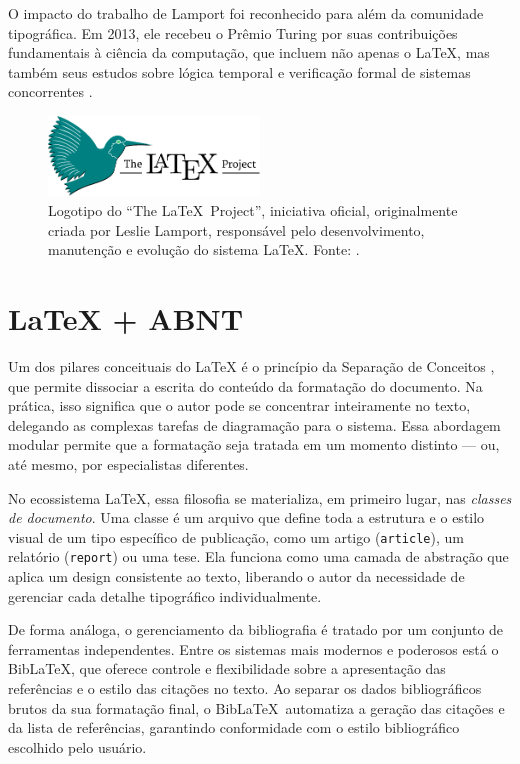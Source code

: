 O impacto do trabalho de Lamport foi reconhecido para além da comunidade tipográfica. Em 2013, ele recebeu o Prêmio Turing por suas contribuições fundamentais à ciência da computação, que incluem não apenas o \LaTeX, mas também seus estudos sobre lógica temporal e verificação formal de sistemas concorrentes \cite{LamportTuring2013}.

\begin{figure}
    \centering
    \includegraphics[width=0.5\textwidth]{img/LaTeX_project_logo.pdf}
    \caption{Logotipo do ``The \LaTeX\ Project'', iniciativa oficial, originalmente criada por Leslie Lamport, responsável pelo desenvolvimento, manutenção e evolução do sistema \LaTeX. Fonte: \textcite{LaTeXProjectLogo}.}
    \label{fig:latex-project-logo}
\end{figure}

\section{\LaTeX{} + ABNT} \label{sec:latex-abnt}

Um dos pilares conceituais do \LaTeX{} é o princípio da Separação de Conceitos \cite{Dijkstra1982}, que permite dissociar a escrita do conteúdo da formatação do documento. Na prática, isso significa que o autor pode se concentrar inteiramente no texto, delegando as complexas tarefas de diagramação para o sistema. Essa abordagem modular permite que a formatação seja tratada em um momento distinto --- ou, até mesmo, por especialistas diferentes.

No ecossistema \LaTeX{}, essa filosofia se materializa, em primeiro lugar, nas \emph{classes de documento}. Uma classe é um arquivo que define toda a estrutura e o estilo visual de um tipo específico de publicação, como um artigo (\texttt{article}), um relatório (\texttt{report}) ou uma tese. Ela funciona como uma camada de abstração que aplica um design consistente ao texto, liberando o autor da necessidade de gerenciar cada detalhe tipográfico individualmente.

De forma análoga, o gerenciamento da bibliografia é tratado por um conjunto de ferramentas independentes. Entre os sistemas mais modernos e poderosos está o Bib\LaTeX, que oferece controle e flexibilidade sobre a apresentação das referências e o estilo das citações no texto. Ao separar os dados bibliográficos brutos da sua formatação final, o Bib\LaTeX\ automatiza a geração das citações e da lista de referências, garantindo conformidade com o estilo bibliográfico escolhido pelo usuário.

